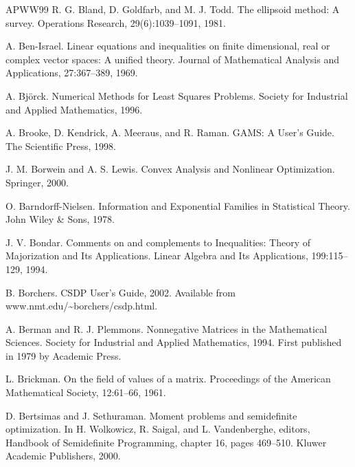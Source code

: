 \begin{thebibliography}{APWW99}
 R. G. Bland, D. Goldfarb, and M. J. Todd. The ellipsoid method: A survey. Operations Research, 29(6):1039–1091, 1981.

 A. Ben-Israel. Linear equations and inequalities on finite dimensional, real or complex vector spaces: A unified theory. Journal of Mathematical Analysis and Applications, 27:367–389, 1969.

 A. Björck. Numerical Methods for Least Squares Problems. Society for Industrial and Applied Mathematics, 1996.

 A. Brooke, D. Kendrick, A. Meeraus, and R. Raman. GAMS: A User’s Guide. The Scientific Press, 1998.

 J. M. Borwein and A. S. Lewis. Convex Analysis and Nonlinear Optimization. Springer, 2000.

 O. Barndorff-Nielsen. Information and Exponential Families in Statistical Theory. John Wiley \& Sons, 1978.

 J. V. Bondar. Comments on and complements to Inequalities: Theory of Majorization and Its Applications. Linear Algebra and Its Applications, 199:115– 129, 1994.

 B. Borchers. CSDP User’s Guide, 2002. Available from www.nmt.edu/\textasciitilde{}borchers/csdp.html.

 A. Berman and R. J. Plemmons. Nonnegative Matrices in the Mathematical Sciences. Society for Industrial and Applied Mathematics, 1994. First published in 1979 by Academic Press.

 L. Brickman. On the field of values of a matrix. Proceedings of the American Mathematical Society, 12:61–66, 1961.

 D. Bertsimas and J. Sethuraman. Moment problems and semidefinite optimization. In H. Wolkowicz, R. Saigal, and L. Vandenberghe, editors, Handbook of Semidefinite Programming, chapter 16, pages 469–510. Kluwer Academic Publishers, 2000.


\end{thebibliography}
